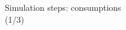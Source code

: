 \documentclass[9pt]{beamer}
\begin{document}
\begin{frame}[fragile]{Simulation steps: consumptions\\(1/3)}
\begin{columns}[T]
 \begin{column}{.3\textwidth}
 \vspace{-4.55\baselineskip}
 \begin{block}{}
  \end{block}
  \end{column}
    
\end{columns}

\end{frame}
\end{document}
